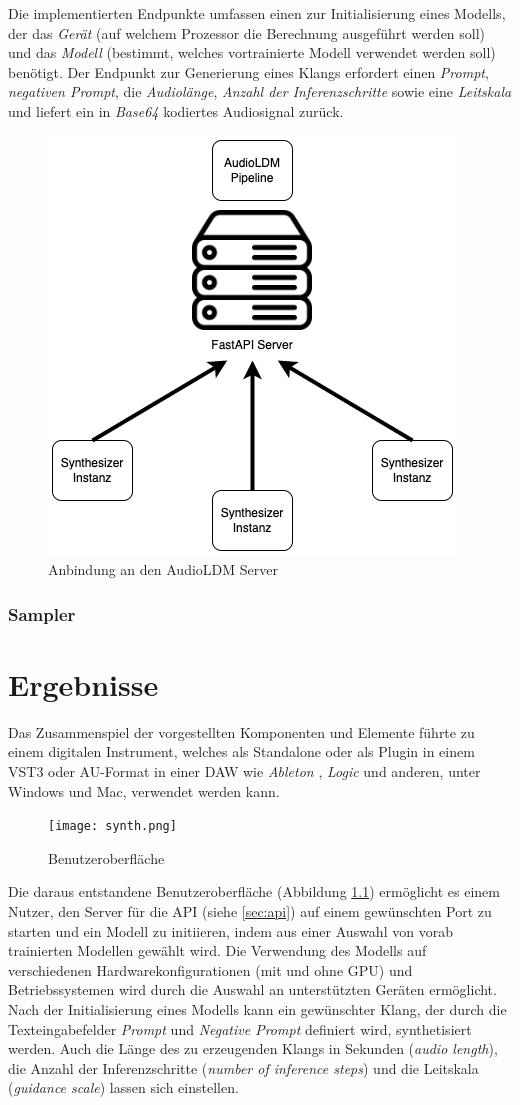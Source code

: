 \documentclass[
  a4paper,  %
  twoside,  %
  bibliography=totoc,
  headsepline,
  cleardoublepage=empty,
  parskip=half,
  draft=false
]{scrbook}
\begin{document}
Die implementierten Endpunkte umfassen einen zur Initialisierung eines Modells, der das \emph{Gerät} (auf welchem Prozessor die Berechnung ausgeführt werden soll) und das \emph{Modell} (bestimmt, welches vortrainierte Modell verwendet werden soll) benötigt. Der Endpunkt zur Generierung eines Klangs erfordert einen \emph{Prompt}, \emph{negativen Prompt}, die \emph{Audiolänge}, \emph{Anzahl der Inferenzschritte} sowie eine \emph{Leitskala} und liefert ein in \emph{Base64} kodiertes Audiosignal zurück.

\begin{figure}
  \centering
  \includegraphics[width=.4\textwidth]{graphics/Server.png}
  \caption[Infrastruktur]{Anbindung an den AudioLDM Server}
  \label{fig:server}
\end{figure}

\subsection{Sampler}

\chapter{Ergebnisse}
Das Zusammenspiel der vorgestellten Komponenten und Elemente führte zu einem digitalen Instrument, welches als Standalone oder als Plugin in einem VST3 oder AU-Format in einer DAW wie \emph{Ableton} \cite{noauthor_ableton_nodate}, \emph{Logic} \cite{noauthor_logic_nodate} und anderen, unter Windows und Mac, verwendet werden kann.

\begin{figure}[h]
  \centering
  \texttt{[image: synth.png]}
  \caption[Benutzeroberfläche]{Benutzeroberfläche}
  \label{fig:synth}
\end{figure} 

Die daraus entstandene Benutzeroberfläche (Abbildung \ref{fig:synth}) ermöglicht es einem Nutzer, den Server für die API (siehe \ref{sec:api}) auf einem gewünschten Port  zu starten und ein Modell zu initiieren, indem aus einer Auswahl von vorab trainierten Modellen gewählt wird. Die Verwendung des Modells auf verschiedenen Hardwarekonfigurationen (mit und ohne GPU) und Betriebssystemen wird durch die Auswahl an unterstützten Geräten ermöglicht. Nach der Initialisierung eines Modells kann ein gewünschter Klang, der durch die Texteingabefelder \emph{Prompt} und \emph{Negative Prompt} definiert wird, synthetisiert werden. Auch die Länge des zu erzeugenden Klangs in Sekunden (\emph{audio length}), die Anzahl der Inferenzschritte (\emph{number of inference steps}) und die Leitskala (\emph{guidance scale}) lassen sich einstellen.
\end{document}

